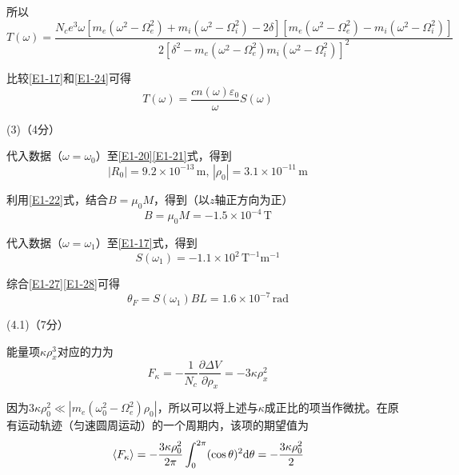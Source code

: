 \documentclass[10pt,a4paper,onecolumn,UTF8]{ctexart}
\begin{document}
	所以
	\begin{equation}\label{E1-24}
		T(\omega)=\frac{N_ce^3\omega\left[m_e(\omega^2-\Omega_e^2)+m_i(\omega^2-\Omega_i^2)-2\delta\right]\left[m_e(\omega^2-\Omega_e^2)-m_i(\omega^2-\Omega_i^2)\right]}{2\left[\delta^2-m_e(\omega^2-\Omega_e^2)m_i(\omega^2-\Omega_i^2)\right]^2}
	\end{equation}
	
	比较\eqref{E1-17}和\eqref{E1-24}可得
	\begin{equation}
		T(\omega)=\frac{cn(\omega)\varepsilon_0}{\omega}S(\omega)
	\end{equation}
	
	(3)（4分）
	
	代入数据（$\omega=\omega_0$）至\eqref{E1-20}\eqref{E1-21}式，得到
	\begin{equation}\label{E1-26}
		|R_0|=9.2\times10^{-13}\,\text{m},\,|\rho_0|=3.1\times10^{-11}\,\text{m}
	\end{equation}
	
	利用\eqref{E1-22}式，结合$B=\mu_0 M$，得到（以$z$轴正方向为正）
	\begin{equation}\label{E1-27}
		B=\mu_0 M=-1.5\times10^{-4}\,\text{T}
	\end{equation}
	
	代入数据（$\omega=\omega_1$）至\eqref{E1-17}式，得到
	\begin{equation}\label{E1-28}
		S(\omega_1)=-1.1\times10^2\,\text{T}^{-1}\text{m}^{-1}
	\end{equation}
	
	综合\eqref{E1-27}\eqref{E1-28}可得
	\begin{equation}
		\theta_F=S(\omega_1)BL=1.6\times10^{-7}\,\text{rad}
	\end{equation}
	
	(4.1)（7分）
	
	能量项$\kappa\rho_x^3$对应的力为
	\begin{equation}\label{E1-30}
		F_{\kappa}=-\frac{1}{N_c}\frac{\partial\Delta V}{\partial\rho_x}=-3\kappa\rho_x^2
	\end{equation}
	
	因为$3\kappa\rho_0^2\ll |m_e(\omega_0^2-\Omega_e^2)\rho_0|$，所以可以将上述与$\kappa$成正比的项当作微扰。在原有运动轨迹（匀速圆周运动）的一个周期内，该项的期望值为
	\begin{equation}\label{E1-31}
		\langle F_{\kappa}\rangle=-\frac{3\kappa\rho_0^2}{2\pi}\int_{0}^{2\pi}(\cos\theta)^2\mathrm{d}\theta=-\frac{3\kappa\rho_0^2}{2}
	\end{equation}
	
\end{document}

